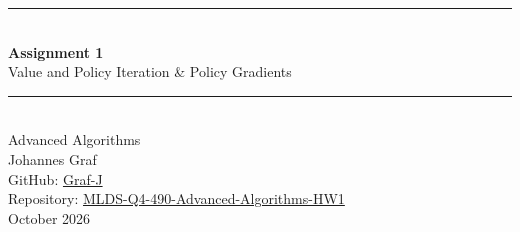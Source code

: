 \documentclass[11pt,a4paper]{article}
\begin{document}
\hypersetup{pageanchor=false}
\begin{titlepage}
  \centering
  \vspace*{3.5cm}
  {\color{accent}\rule{\textwidth}{1.2pt}}\\[1.2em]
  {\Huge\bfseries\color{accent} Assignment 1}\\[0.6em]
  {\LARGE Value and Policy Iteration \& Policy Gradients}\\[1.0em]
  {\color{accent}\rule{\textwidth}{1.2pt}}\\[2.5em]
  {\Large Advanced Algorithms}\\[3.5em]
  {\large Johannes Graf}\\[0.3em]
  {\normalsize GitHub: \href{https://github.com/Graf-J}{Graf-J}}\\[0.3em]
  {\normalsize Repository: \href{https://github.com/Graf-J/MLDS-Q4-490-Advanced-Algorithms-HW1}{MLDS-Q4-490-Advanced-Algorithms-HW1}}\\[3em]
  {\normalsize October 2026}
  \vfill
\end{titlepage}
\hypersetup{pageanchor=true}

\tableofcontents
\clearpage








\end{document}
